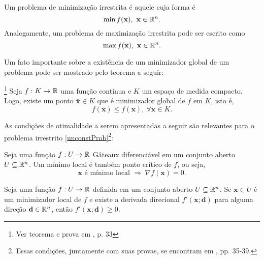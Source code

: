\begin{definition}
Um problema de minimiza\c{c}\~{a}o irrestrita \'{e} aquele cuja forma \'{e}
\begin{equation}
\label{unconstProb}
\min f(\mathbf{x}),~\mathbf{x} \in \mathbb{R}^{n}.
\end{equation}
Analogamente, um problema de maximiza\c{c}\~{a}o irrestrita pode ser escrito como
\begin{equation}
\max f(\mathbf{x}),~\mathbf{x} \in \mathbb{R}^{n}.
\end{equation}
\end{definition}

Um fato importante sobre a exist\^{e}ncia de um minimizador global de um problema pode ser mostrado pelo teorema a seguir:

\begin{theorem}\footnote{Ver teorema e prova em \cite{guller}, p. 33}
Seja $f: K \to \mathbb{R}$ uma fun\c{c}\~{a}o cont\'{i}nua e $K$ um espa\c{c}o de medida compacto. Logo, existe um ponto $\mathbf{\bar{x}} \in K$ que \'{e} minimizador global de $f$ em $K$, isto \'{e},
\begin{equation*}
f(\mathbf{\bar{x}}) \le f(\mathbf{x}),~\forall \mathbf{x} \in K.
\end{equation*} 
\end{theorem}

As condi\c{c}\~{o}es de otimalidade a serem apresentadas a seguir s\~{a}o relevantes para o problema irrestrito \eqref{unconstProb}\footnote{Essas condi\c{c}\~{o}es, juntamente com suas provas, se encontram em \cite{guller}, pp. 35-39.}:

\begin{theorem}\label{theoCO1}
Seja uma fun\c{c}\~{a}o $f: U \to \mathbb{R}$ G\^{a}teaux diferenci\'{a}vel em um conjunto aberto $U \subseteq \mathbb{R}^{n}$. Um m\'{i}nimo local \'{e} tamb\'{e}m ponto cr\'{i}tico de $f$, ou seja, 
\begin{equation*}
\mathbf{x} \text{ \'{e} m\'{i}nimo local } \Rightarrow ~ \nabla f(\mathbf{x}) = 0.
\end{equation*}
\end{theorem}

\begin{corollary}
Seja uma fun\c{c}\~{a}o $f: U \to \mathbb{R}$ definida em um conjunto aberto $U \subseteq \mathbb{R}^{n}$. Se $\mathbf{x} \in U$ \'{e} um minimizador local de $f$ e existe a derivada direcional $f'(\mathbf{x};\mathbf{d})$ para alguma dire\c{c}\~{a}o $\mathbf{d} \in \mathbb{R}^{n}$, ent\~{a}o $f'(\mathbf{x};\mathbf{d}) \ge 0$.
\end{corollary}

